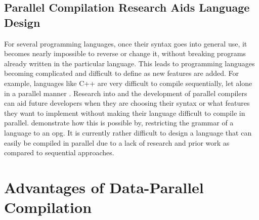 \subsection{Parallel Compilation Research Aids Language Design}

For several programming languages, once their syntax goes into general
use, it becomes nearly impossible to reverse or change it, without breaking
programs already written in the particular language. This leads to programming
languages becoming complicated and difficult to define as new features
are added. For example, languages like C++ are very difficult to compile
sequentially, let alone in a parallel manner \citep{noauthor_most_2022,
noauthor_difficulties_nodate}. Research into and the development of parallel
compilers can aid future developers when they are choosing their syntax or
what features they want to implement without making their language difficult
to compile in parallel. \cite{barenghi_parallel_2015} demonstrate how this is
possible by, restricting the grammar of a language to an \gls{opg}.
It is currently rather difficult to design a language that can easily be
compiled in parallel due to a lack of research and prior work as compared to
sequential approaches.

\section{Advantages of Data-Parallel Compilation} \label{advantages_of_data_p_comp}

